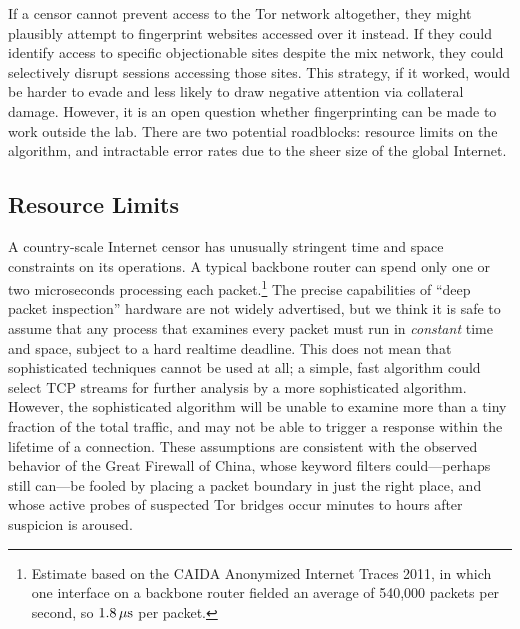 \documentclass{cmuecequal}
\begin{document}
If a censor cannot prevent access to the Tor network altogether, they
might plausibly attempt to fingerprint websites accessed over it
instead.  If they could identify access to specific objectionable
sites despite the mix network, they could selectively disrupt sessions
accessing those sites.  This strategy, if it worked, would be harder
to evade and less likely to draw negative attention via collateral
damage.  However, it is an open question whether fingerprinting can be
made to work outside the lab.  There are two potential roadblocks:
resource limits on the algorithm, and intractable error rates due to
the sheer size of the global Internet.

\subsection{Resource Limits}

A country-scale Internet censor has unusually stringent time and space
constraints on its operations.  A typical backbone router can spend
only one or two microseconds processing each packet.\footnote{Estimate
  based on the CAIDA Anonymized Internet Traces 2011, in which one
  interface on a backbone router fielded an average of 540,000 packets
  per second, so $1.8\,\mu\hbox{s}$ per packet.} The precise
capabilities of “deep packet inspection” hardware are not widely
advertised, but we think it is safe to assume that any process that
examines every packet must run in \emph{constant} time and space,
subject to a hard realtime deadline.  This does not mean that
sophisticated techniques cannot be used at all; a simple, fast
algorithm could select TCP streams for further analysis by a more
sophisticated algorithm.  However, the sophisticated algorithm will be
unable to examine more than a tiny fraction of the total traffic, and
may not be able to trigger a response within the lifetime of a
connection.  These assumptions are consistent with the observed
behavior of the Great Firewall of China, whose keyword filters
could---perhaps still can---be fooled by placing a packet boundary in
just the right place, and whose active probes of suspected Tor bridges
occur minutes to hours after suspicion is aroused.
\end{document}

